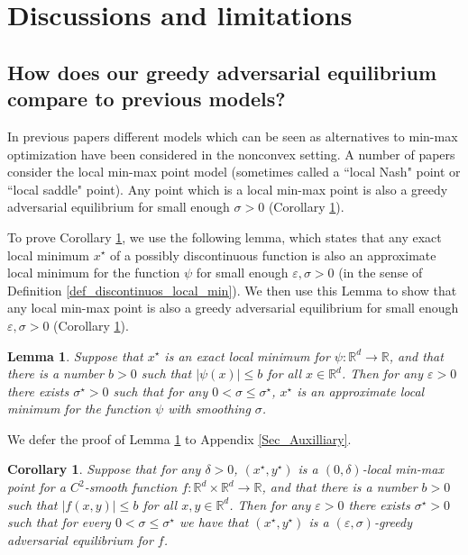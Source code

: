 \documentclass[11pt,letterpaper]{article}
\renewcommand{\epsilon}{\varepsilon}
\newtheorem{lemma}[theorem]{Lemma}
\newtheorem{corollary}[theorem]{Corollary}
\begin{document}
\section{Discussions and limitations} \label{Sec_Discussions_and_Limitations}



\subsection{How does our greedy adversarial equilibrium compare to previous models?} \label{sec_comparison_to_previous_notions}

In previous papers different models which can be seen as alternatives to min-max optimization have been considered in the nonconvex setting. 
%
 A number of papers \cite{daskalakis2018limit, heusel2017gans, adolphs2018local} consider the local min-max point model (sometimes called a ``local Nash" point or ``local saddle" point). %
Any point which is a local min-max point is also a greedy adversarial equilibrium for small enough $\sigma>0$ (Corollary \ref{corollary_exact_greedy_minmax}).

  To prove Corollary \ref{corollary_exact_greedy_minmax}, we use the following lemma, which states that any exact local minimum $x^\star$ of a possibly discontinuous function is also an approximate local minimum for the function $\psi$ for small enough $\epsilon, \sigma>0$ (in the sense of Definition \ref{def_discontinuos_local_min}).  We then use this Lemma to show that any local min-max point is also a greedy adversarial equilibrium for small enough $\epsilon, \sigma>0$ (Corollary \ref{corollary_exact_greedy_minmax}).


\begin{lemma} \label{lemma_local_nash}
Suppose that $x^\star$ is an exact local minimum for $\psi: \mathbb{R}^d \rightarrow \mathbb{R}$, and that there is a number $b>0$ such that $|\psi(x)| \leq b$ for all $x \in \mathbb{R}^d$.  Then for any $\epsilon>0$ there exists $\sigma^\star>0$ such that for any $0< \sigma \leq \sigma^\star$,  $x^\star$ is an approximate local minimum for the function $\psi$ with smoothing $\sigma$.
\end{lemma}

\noindent
We defer the proof of Lemma \ref{lemma_local_nash} to Appendix \ref{Sec_Auxilliary}.

  \begin{corollary} \label{corollary_exact_greedy_minmax}
  Suppose that for any $\delta>0$, $(x^\star, y^\star)$ is a $(0, \delta)$-local min-max point for a $C^2$-smooth function $f: \mathbb{R}^d \times \mathbb{R}^d \rightarrow \mathbb{R}$, and that there is a number $b>0$ such that $|f(x,y)| \leq b$ for all $x,y \in \mathbb{R}^d$.  Then for any $\epsilon>0$ there exists  $\sigma^\star>0$ such that for every $0< \sigma \leq  \sigma^\star$ we have that $(x^\star, y^\star)$ is a  $(\epsilon, \sigma)$-greedy adversarial equilibrium for $f$.
\end{corollary}
\end{document}
